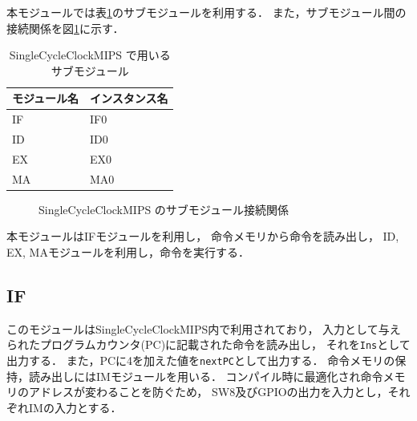 本モジュールでは表\ref{tab:sccm_mod}のサブモジュールを利用する．
また，サブモジュール間の接続関係を図\ref{fig:sccm_mod}に示す．
\begin{table}[h]
  \caption{SingleCycleClockMIPS で用いるサブモジュール}
  \centering
  \begin{tabular}{l|l}
    モジュール名 & インスタンス名 \\
    \hline
    IF & IF0 \\
    ID & ID0 \\
    EX & EX0 \\
    MA & MA0 \\
  \end{tabular}
  \label{tab:sccm_mod}
\end{table}
\begin{figure}
  \centering
  \caption{SingleCycleClockMIPS のサブモジュール接続関係}
  \label{fig:sccm_mod}
\end{figure}

本モジュールはIFモジュールを利用し，
命令メモリから命令を読み出し，
ID, EX, MAモジュールを利用し，命令を実行する．

\subsection{IF}
このモジュールはSingleCycleClockMIPS内で利用されており，
入力として与えられたプログラムカウンタ(PC)に記載された命令を読み出し，
それを\texttt{Ins}として出力する．
また，PCに4を加えた値を\texttt{nextPC}として出力する．
命令メモリの保持，読み出しにはIMモジュールを用いる．
コンパイル時に最適化され命令メモリのアドレスが変わることを防ぐため，
SW8及びGPIOの出力を入力とし，それぞれIMの入力とする．

